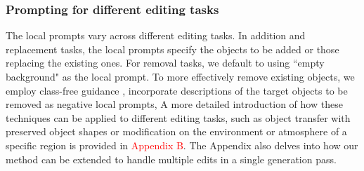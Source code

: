 \documentclass{article}
\begin{document}
\subsubsection{Prompting for different editing tasks}

The local prompts vary across different editing tasks. In addition and replacement tasks, the local prompts specify the objects to be added or those replacing the existing ones. For removal tasks, we default to using ``empty background" as the local prompt. To more effectively remove existing objects, we employ class-free guidance \citep{ho2022classifier}, incorporate descriptions of the target objects to be removed as negative local prompts, A more detailed introduction of how these techniques can be applied to different editing tasks, such as object transfer with preserved object shapes or modification on the environment or atmosphere of a specific region is provided in \textcolor{red}{Appendix B}. The Appendix also delves into how our method can be extended to handle multiple edits in a single generation pass.

\end{document}
